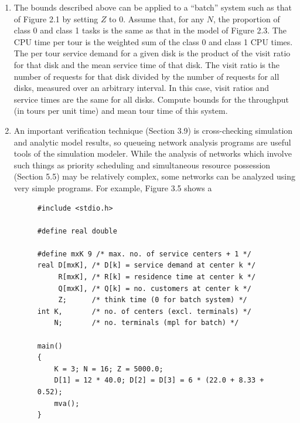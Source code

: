 \begin{enumerate}
Plot the throughput and response time bounds for the timesharing model of
problem 3, Chapter 2 for $N$ in the range 1 to 24. Locate the throughput and
response time values obtained from simulation on this plot. Assume that the
CPU in this system is replaced by a CPU of twice the speed, and plot response
 time bounds again.

\item The bounds described above can be applied to a ``batch'' system such as
that of Figure 2.1 by setting $Z$ to 0. Assume that, for any $N$, the
proportion of class 0 and class 1 tasks is the same as that in the model of
Figure 2.3. The CPU time per tour is the weighted sum of the class 0 and class
1 CPU times. The per tour service demand for a given disk is the product of
the visit ratio for that disk and the mean service time of that disk. The visit
ratio is the number of requests for that disk divided by the number of
requests for all disks, measured over an arbitrary interval. In this case,
visit ratios and service times are the same for all disks. Compute bounds for
the throughput (in tours per unit time) and mean tour time of this system.

\item An important verification technique (Section 3.9) is cross-checking
simulation and analytic model results, so queueing network analysis programs
are useful tools of the simulation modeler. While the analysis of networks
which involve such things as priority scheduling and simultaneous resource
possession (Section 5.5) may be relatively complex, some networks can be
analyzed using very simple programs. For example, Figure 3.5 shows a
\begin{figure}[H]
\centering
\begingroup\footnotesize
\begin{verbatim}
#include <stdio.h>

#define real double

#define mxK 9 /* max. no. of service centers + 1 */
real D[mxK], /* D[k] = service demand at center k */
     R[mxK], /* R[k] = residence time at center k */
     Q[mxK], /* Q[k] = no. customers at center k */
     Z;      /* think time (0 for batch system) */
int K,       /* no. of centers (excl. terminals) */
    N;       /* no. terminals (mpl for batch) */

main()
{
    K = 3; N = 16; Z = 5000.0;
    D[1] = 12 * 40.0; D[2] = D[3] = 6 * (22.0 + 8.33 + 0.52);
    mva();
}


\end{verbatim}
\end{figure}
\end{enumerate}
